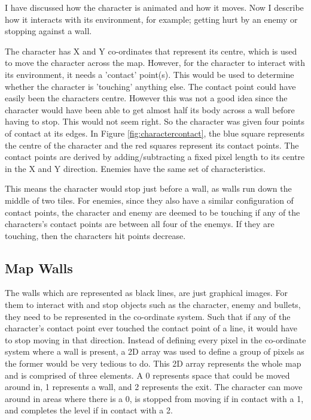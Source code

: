 \documentclass[a4paper,11.5pt]{report}
\numberwithin{figure}{section}
\numberwithin{table}{section}
\numberwithin{equation}{section}
\numberwithin{equation}{section}
\begin{document}
I have discussed how the character is animated and how it moves. Now I describe how it interacts with its environment, for example; getting hurt by an enemy or stopping against a wall.

The character has X and Y co-ordinates that represent its centre, which is used to move the character across the map. However, for the character to interact with its environment, it needs a 'contact' point(s). This would be used to determine whether the character is 'touching' anything else. The contact point could have easily been the characters centre. However this was not a good idea since the character would have been able to get almost half its body across a wall before having to stop. This would not seem right. So the character was given four points of contact at its edges. In Figure \ref{fig:charactercontact}, the blue square represents the centre of the character and the red squares represent its contact points. The contact points are derived by adding/subtracting a fixed pixel length to its centre in the X and Y direction. Enemies have the same set of characteristics.

This means the character would stop just before a wall, as walls run down the middle of two tiles. For enemies, since they also have a similar configuration of contact points, the character and enemy are deemed to be touching if any of the characters's contact points are between all four of the enemys. If they are touching, then the characters hit points decrease.


\subsection{Map Walls}

The walls which are represented as black lines, are just graphical images. For them to interact with and stop objects such as the character, enemy and bullets, they need to be represented in the co-ordinate system. Such that if any of the character's contact point ever touched the contact point of a line, it would have to stop moving in that direction. Instead of defining every pixel in the co-ordinate system where a wall is present, a 2D array was used to define a group of pixels as the former would be very tedious to do. This 2D array represents the whole map and is comprised of three elements. A 0 represents space that could be moved around in, 1 represents a wall, and 2 represents the exit. The character can move around in areas where there is a 0, is stopped from moving if in contact with a 1, and completes the level if in contact with a 2.
\end{document}
